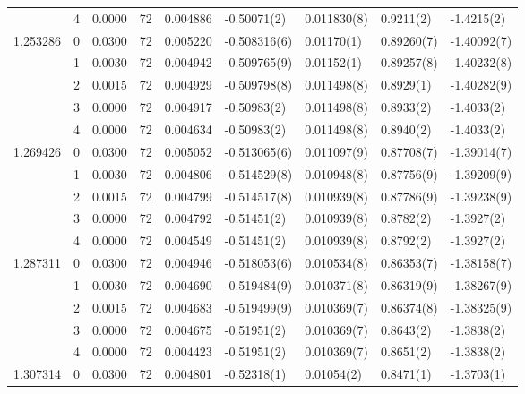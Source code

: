 \begin{tabular}{llrrrllll}
         & 4 &    0.0000 &     72 &  0.004886 &    -0.50071(2) &     0.011830(8) &      0.9211(2) &     -1.4215(2) \\
1.253286 & 0 &    0.0300 &     72 &  0.005220 &   -0.508316(6) &      0.01170(1) &     0.89260(7) &    -1.40092(7) \\
         & 1 &    0.0030 &     72 &  0.004942 &   -0.509765(9) &      0.01152(1) &     0.89257(8) &    -1.40232(8) \\
         & 2 &    0.0015 &     72 &  0.004929 &   -0.509798(8) &     0.011498(8) &      0.8929(1) &    -1.40282(9) \\
         & 3 &    0.0000 &     72 &  0.004917 &    -0.50983(2) &     0.011498(8) &      0.8933(2) &     -1.4033(2) \\
         & 4 &    0.0000 &     72 &  0.004634 &    -0.50983(2) &     0.011498(8) &      0.8940(2) &     -1.4033(2) \\
1.269426 & 0 &    0.0300 &     72 &  0.005052 &   -0.513065(6) &     0.011097(9) &     0.87708(7) &    -1.39014(7) \\
         & 1 &    0.0030 &     72 &  0.004806 &   -0.514529(8) &     0.010948(8) &     0.87756(9) &    -1.39209(9) \\
         & 2 &    0.0015 &     72 &  0.004799 &   -0.514517(8) &     0.010939(8) &     0.87786(9) &    -1.39238(9) \\
         & 3 &    0.0000 &     72 &  0.004792 &    -0.51451(2) &     0.010939(8) &      0.8782(2) &     -1.3927(2) \\
         & 4 &    0.0000 &     72 &  0.004549 &    -0.51451(2) &     0.010939(8) &      0.8792(2) &     -1.3927(2) \\
1.287311 & 0 &    0.0300 &     72 &  0.004946 &   -0.518053(6) &     0.010534(8) &     0.86353(7) &    -1.38158(7) \\
         & 1 &    0.0030 &     72 &  0.004690 &   -0.519484(9) &     0.010371(8) &     0.86319(9) &    -1.38267(9) \\
         & 2 &    0.0015 &     72 &  0.004683 &   -0.519499(9) &     0.010369(7) &     0.86374(8) &    -1.38325(9) \\
         & 3 &    0.0000 &     72 &  0.004675 &    -0.51951(2) &     0.010369(7) &      0.8643(2) &     -1.3838(2) \\
         & 4 &    0.0000 &     72 &  0.004423 &    -0.51951(2) &     0.010369(7) &      0.8651(2) &     -1.3838(2) \\
1.307314 & 0 &    0.0300 &     72 &  0.004801 &    -0.52318(1) &      0.01054(2) &      0.8471(1) &     -1.3703(1) \\

\end{tabular}
